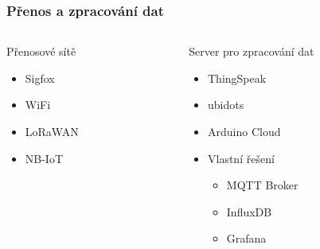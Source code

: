 \documentclass[%
  12pt,       				%
	t,                  %
	aspectratio=1610,   %
	unicode,						%
]{beamer}				    	%
\begin{document}
\begin{frame}
	\frametitle{Přenos a zpracování dat}
	\begin{columns}[T]
		\begin{column}{0.5\columnwidth}
			Přenosové sítě
			\begin{itemize}
				\item Sigfox
				\item WiFi
				\item LoRaWAN
				\item NB-IoT
			\end{itemize}
		\end{column}

		\begin{column}{0.5\columnwidth}
			Server pro zpracování dat
			\begin{itemize}
				\item ThingSpeak
				\item ubidots
				\item Arduino Cloud
				\item Vlastní řešení
				\begin{itemize}
					\item MQTT Broker
					\item InfluxDB
					\item Grafana
				\end{itemize}
			\end{itemize}
		\end{column}
	\end{columns}
\end{frame}

\end{document}
